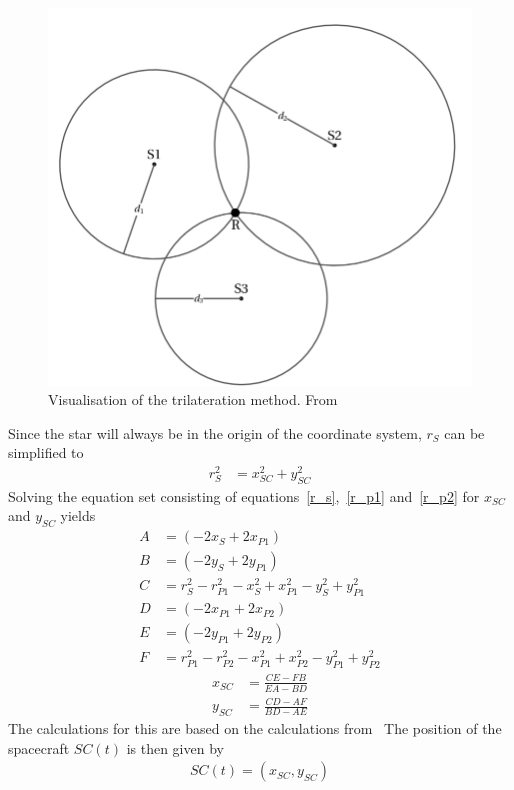 \documentclass[reprint,english,notitlepage]{revtex4-2}
\begin{document}
\begin{figure}[h]
	\centering
	\includegraphics[scale=0.2]{Figures/trilateration}
	\caption{Visualisation of the trilateration method. From~\parencite[][]{trilateration_picture}
	}
	\label{fig:trilateration_figure}
\end{figure}
Since the star will always be in the origin of the coordinate system, $r_S$ can be simplified to
\begin{align*}
    r_S^2 &= x_{SC}^2 + y_{SC}^2
\end{align*}
Solving the equation set consisting of equations~\eqref{r_s},~\eqref{r_p1} and~\eqref{r_p2} for $x_{SC}$ and $y_{SC}$ yields
\begin{align*}
    A& = \left(-2x_S + 2x_{P1}\right)\\
	B& = \left(-2y_S + 2y_{P1}\right)\\
	C& = r_S^2 - r_{P1}^2 - x_S^2 + x_{P1}^2 - y_S^2 + y_{P1}^2\\
	D& = \left(-2x_{P1} + 2x_{P2}\right)\\
	E& = \left(-2y_{P1} + 2y_{P2}\right)\\
	F& = r_{P1}^2 - r_{P2}^2 - x_{P1}^2 + x_{P2}^2 - y_{P1}^2 + y_{P2}^2
\end{align*}
\begin{align*}
    x_{SC}& = \frac{CE - FB}{EA - BD}\\
	y_{SC}& = \frac{CD - AF}{BD - AE}
\end{align*}
The calculations for this are based on the calculations from~\parencite[][]{trilateration}
The position of the spacecraft $SC(t)$ is then given by
\begin{align*}
    SC(t) = \left(x_{SC}, y_{SC} \right)
\end{align*}
\end{document}
